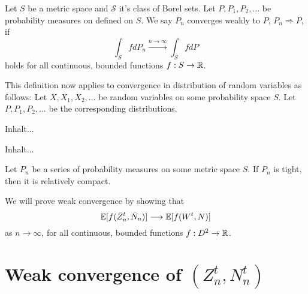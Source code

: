 
\begin{definition}
	Let $S$ be a metric space and $\mathcal{S}$ it's class of Borel sets.
	Let $P, P_1, P_2, \dots$ be probability measures on defined on $S$.
	We say $P_n$ converges weakly to $P$, $P_n \Rightarrow P$, if
	\begin{equation} 
	\int_S fdP_n \xrightarrow{n \rightarrow \infty} \int_S fdP
	\end{equation}
	holds for all continuous, bounded functions $f: S \rightarrow \mathbb{R}$.
\end{definition}

This definition now applies to convergence in distribution of random variables as follows:
Let $X, X_1, X_2, \dots$ be random variables on some probability space $S$.
Let $P, P_1, P_2, \dots$ be the corresponding distributions. 

\begin{definition}[Tightness] \label{D: Tightness}
	Inhalt...
\end{definition}

\begin{definition} \label{D: Rel Compactness}
	Inhalt...
\end{definition}

\begin{theorem} \label{T: Prohorov}
	Let $P_n$ be a series of probability measures on some metric space $S$. If $P_n$ is tight, then it is relatively compact.
\end{theorem}



We will prove weak convergence by showing that
\begin{equation}
\mathbb{E}[ f(\bar{Z}^t_n, \bar{N}_n) ] \longrightarrow \mathbb{E}[ f(W^t, N) ]
\end{equation}
as $n \rightarrow \infty$, 
for all continuous, bounded functions 
$f: D^2 \rightarrow \mathbb{R}$.


\section{Weak convergence of $(Z^t_n, N^t_n)$}
